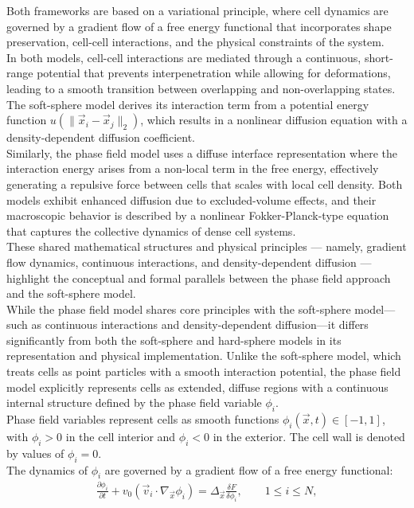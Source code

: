 Both frameworks are based on a variational principle, where cell dynamics are governed by a gradient flow of a free energy functional that incorporates shape preservation, cell-cell interactions, and the physical constraints of the system. \\
In both models, cell-cell interactions are mediated through a continuous, short-range potential that prevents interpenetration while allowing for deformations, leading to a smooth transition between overlapping and non-overlapping states. 
The soft-sphere model derives its interaction term from a potential energy function $u(\|\vec{x}_i - \vec{x}_j\|_2)$, which results in a nonlinear diffusion equation with a density-dependent diffusion coefficient. \\
Similarly, the phase field model uses a diffuse interface representation where the interaction energy arises from a non-local term in the free energy, effectively generating a repulsive force between cells that scales with local cell density. 
Both models exhibit enhanced diffusion due to excluded-volume effects, and their macroscopic behavior is described by a nonlinear Fokker-Planck-type equation that captures the collective dynamics of dense cell systems. \\
These shared mathematical structures and physical principles — namely, gradient flow dynamics, continuous interactions, and density-dependent diffusion — highlight the conceptual and formal parallels between the phase field approach and the soft-sphere model. \\
While the phase field model shares core principles with the soft-sphere model—such as continuous interactions and density-dependent diffusion—it differs significantly from both the soft-sphere and hard-sphere models in its representation and physical implementation. 
Unlike the soft-sphere model, which treats cells as point particles with a smooth interaction potential, the phase field model explicitly represents cells as extended, diffuse regions with a continuous internal structure defined by the phase field variable $\phi_i$. \\
Phase field variables represent cells as smooth functions $\phi_i(\vec{x}, t) \in [-1, 1]$, with $\phi_i > 0$ in the cell interior and $\phi_i <0$ in the exterior. 
The cell wall is denoted by values of $\phi_i = 0$. \\
The dynamics of $\phi_i$ are governed by a gradient flow of a free energy functional:
\begin{align}
	\frac{\partial \phi_i}{\partial t} + v_0 (\vec{v}_i \cdot \nabla_{\vec{x}} \phi_i) = \Delta_{\vec{x}} \frac{\delta F}{\delta \phi_i}, \qquad 1 \leq i \leq N \label{eq:phasefield},
\end{align}
